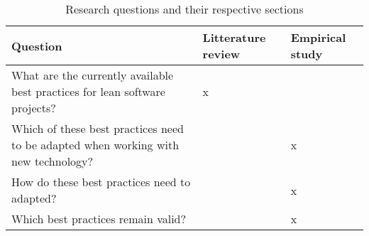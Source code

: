 \begin{table}
  \begin{tabular}{p{200pt} | p{70pt} | p{70pt}}
    Question & Litterature review & Empirical study \\
    \hline
    What are the currently available best practices for lean software projects? & x & \\
    Which of these best practices need to be adapted when working with new technology? &  & x \\
    How do these best practices need to adapted? &  & x \\
    Which best practices remain valid? &  & x \\
  \end{tabular}
  \caption{Research questions and their respective sections}
  \label{tbl:questions}
\end{table}